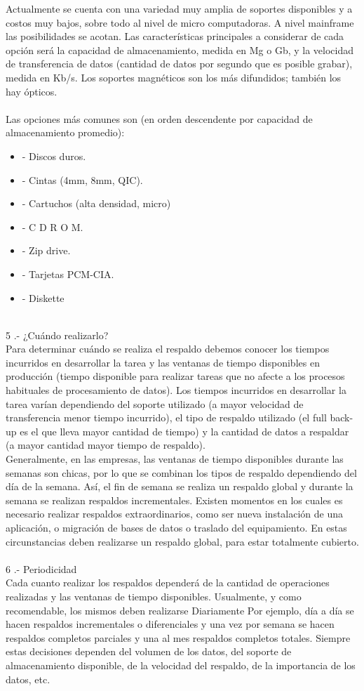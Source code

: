 Actualmente se cuenta con una variedad muy amplia de soportes disponibles y a costos muy bajos, sobre todo al nivel de micro computadoras. A nivel mainframe las posibilidades se acotan. Las características principales a considerar de cada opción será la capacidad de almacenamiento, medida en Mg o Gb, y la velocidad de transferencia de datos (cantidad de datos por segundo que es posible grabar), medida en Kb/s. Los soportes magnéticos son los más difundidos; también los hay ópticos.  
\\ \\
Las opciones más comunes son (en orden descendente por capacidad de almacenamiento promedio):  
\begin{itemize}
\item - Discos duros.
\item - Cintas (4mm, 8mm, QIC).
\item - Cartuchos (alta densidad, micro)
\item - C D R O M.
\item - Zip drive.
\item - Tarjetas PCM-CIA.
\item - Diskette 
\end{itemize}
\\
5 .- ¿Cuándo realizarlo? 
\\
Para determinar cuándo se realiza el respaldo debemos conocer los tiempos incurridos en desarrollar la tarea y las ventanas de tiempo disponibles en producción (tiempo disponible para realizar tareas que no afecte a los procesos habituales de procesamiento de datos). Los tiempos incurridos en desarrollar la tarea varían dependiendo del soporte utilizado (a mayor velocidad de transferencia menor tiempo incurrido), el tipo de respaldo utilizado (el full back-up es el que lleva mayor cantidad de tiempo) y la cantidad de datos a respaldar (a mayor cantidad mayor tiempo de respaldo). \\
Generalmente, en las empresas, las ventanas de tiempo disponibles durante las semanas son chicas, por lo que se combinan los tipos de respaldo  dependiendo del día de la semana. Así, el fin de semana se realiza un respaldo global y durante la semana se realizan respaldos incrementales. Existen momentos en los cuales es necesario realizar respaldos extraordinarios, como ser nueva instalación de una aplicación, o migración de bases de datos o traslado del equipamiento. En estas circunstancias deben realizarse un respaldo global, para estar totalmente cubierto. 
\\\\
6 .- Periodicidad 
\\
Cada cuanto realizar los respaldos dependerá de la cantidad de operaciones realizadas y las ventanas de tiempo disponibles. Usualmente, y como recomendable, los mismos deben realizarse Diariamente Por ejemplo, día a día se hacen respaldos incrementales o diferenciales y una vez por semana se hacen respaldos completos parciales y una al mes respaldos completos totales. Siempre estas decisiones dependen del volumen de los datos, del soporte de almacenamiento disponible, de la velocidad del respaldo, de la importancia de los datos, etc. 
\\\\

